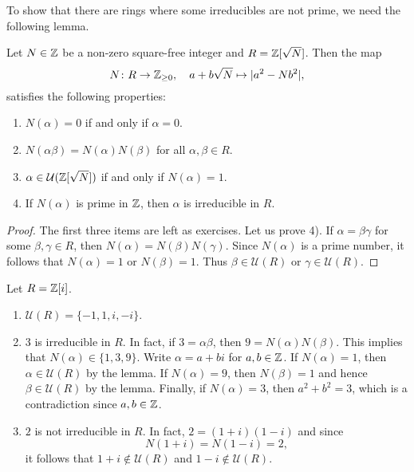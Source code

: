 To show that there are rings where some irreducibles are not prime, 
we need the following lemma. 

\begin{lemma}
Let $N\in\mathbb{Z}$ be a non-zero square-free integer and $R=\mathbb{Z}[\sqrt{N}]$. Then 
the map 
\[
	N\colon R\to\mathbb{Z}_{\geq0},
\quad a+b\sqrt{N}\mapsto 
|a^2-Nb^2|,
\]
satisfies the following properties:
\begin{enumerate}
	\item $N(\alpha)=0$ if and only if $\alpha=0$. 
	\item $N(\alpha\beta)=N(\alpha)N(\beta)$ for all $\alpha,\beta\in R$. 
	\item $\alpha\in\mathcal{U}(\mathbb{Z}[\sqrt{N}])$ if and only if $N(\alpha)=1$. 
	\item If $N(\alpha)$ is prime in $\mathbb{Z}$, then $\alpha$ is irreducible in $R$. 
\end{enumerate}	
\end{lemma}

\begin{proof}
	The first three items are left as exercises. Let us prove 4). 
	If $\alpha=\beta\gamma$ for some $\beta,\gamma\in R$, then
	$N(\alpha)=N(\beta)N(\gamma)$. Since $N(\alpha)$ is a prime number, it follows that
	$N(\alpha)=1$ or $N(\beta)=1$. Thus $\beta\in\mathcal{U}(R)$ or $\gamma\in\mathcal{U}(R)$. 	
\end{proof}

\begin{example}
	Let $R=\mathbb{Z}[i]$. 
	\begin{enumerate}
		\item $\mathcal{U}(R)=\{-1,1,i,-i\}$.
		\item $3$ is irreducible in $R$. In fact, if $3=\alpha\beta$, then
			$9=N(\alpha)N(\beta)$. This implies that $N(\alpha)\in\{1,3,9\}$. Write
			$\alpha=a+bi$ for $a,b\in\mathbb{Z}$. If $N(\alpha)=1$, then $\alpha\in\mathcal{U}(R)$ by the lemma. 
			If $N(\alpha)=9$, then $N(\beta)=1$ and hence $\beta\in\mathcal{U}(R)$ by the lemma. Finally, 
			if $N(\alpha)=3$, then $a^2+b^2=3$, which is a contradiction since $a,b\in\mathbb{Z}$. 
		\item $2$ is not irreducible in $R$. In fact, $2=(1+i)(1-i)$ and
			since \[
			N(1+i)=N(1-i)=2,
			\]
			it follows that $1+i\not\in\mathcal{U}(R)$ 
			and $1-i\not\in\mathcal{U}(R)$. 
	\end{enumerate}	
\end{example}

